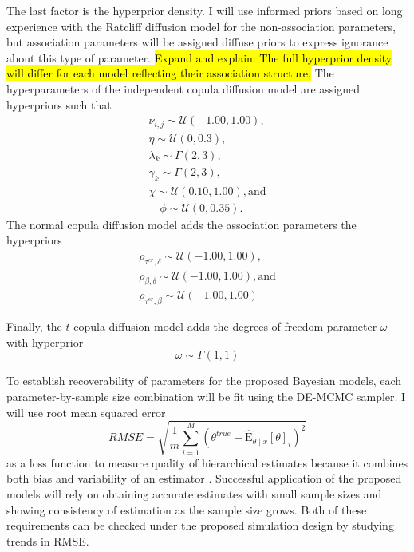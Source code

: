 \documentclass[12pt]{article}
\newcommand{\trish}[1]{\textrm{\hl{#1}}}
\begin{document}
The last factor is the hyperprior density. I
will use informed priors based on long experience with the Ratcliff
diffusion model \citep{MatWag2009} for the non-association parameters,
but association parameters will be assigned diffuse priors to express
ignorance about this type of parameter. \trish{Expand and explain: The
full hyperprior density will differ for each model reflecting their
association structure.} The hyperparameters of the independent copula diffusion model are
assigned hyperpriors such that
%
\begin{gather}
\nu_{i,j} \sim \mathcal{U}(-1.00, 1.00), \nonumber \\
\eta \sim \mathcal{U}(0, 0.3), \nonumber \\
\lambda_k \sim \Gamma(2, 3), \nonumber \\
\gamma_k \sim \Gamma(2, 3), \nonumber \\
\chi \sim \mathcal{U}(0.10, 1.00), \text{and} \nonumber \\
\quad \phi \sim \mathcal{U}(0, 0.35).
\end{gather}
%
The normal copula diffusion model adds the association parameters the hyperpriors
\begin{eqnarray}
\rho_{\tau^{er},\delta} \sim \mathcal{U}(-1.00, 1.00), \nonumber \\
\rho_{\beta,\delta} \sim \mathcal{U}(-1.00, 1.00), \text{and} \nonumber \\
\rho_{\tau^{er},\beta} \sim \mathcal{U}(-1.00, 1.00)
\end{eqnarray}

Finally, the $t$ copula diffusion model adds the degrees of freedom
parameter $\omega$ with hyperprior
%
\begin{equation}
\omega \sim \Gamma(1, 1)
\end{equation}
 
To establish recoverability of parameters for the proposed
Bayesian models, each parameter-by-sample size combination will be
fit using the DE-MCMC sampler.  I will use root mean squared error
%
\begin{equation}
RMSE = \sqrt{\frac{1}{m}\sum_{i=1}^M (\theta^{true} - \operatorname{\hat E}_{\theta \mid x}[\theta]_i)^2}
\end{equation}
%
as a loss function to measure quality of hierarchical estimates
because it combines both bias and variability of an estimator
\citep{CasBer2002,RatTue2002,RouLu2005}. Successful application of the
proposed models will rely on obtaining accurate estimates with small
sample sizes and showing consistency of estimation as the sample size
grows. Both of these requirements can be checked under the proposed
simulation design by studying trends in RMSE. 
\end{document}
